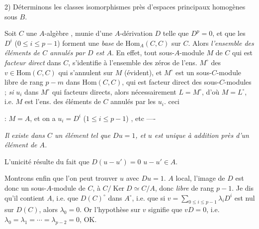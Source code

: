\documentclass[11pt,a4paper]{article}
\begin{document}

2) Déterminons les classes  isomorphismes près d'espaces
\struck{\ill{}} principaux homogènes sous $B$.

Soit $C$ une $A$-algèbre , munie d'une
$A$-dérivation $D$ telle que $D^p = 0$, et que les $D^i$
($0 \leq i \leq p-1$) forment une \emph{base} de
$\mathrm{Hom}_A(C, C)$ sur $C$. Alors \emph{l'ensemble des éléments de
$C$ annulés par $D$ est $A$}. En effet, tout sous-$A$-module $M$ de $C$
qui est  \emph{facteur direct} dans $C$,
s'identifie à l'ensemble des zéros de  l'ens.
$M^\circ$ des $v \in \mathrm{Hom}(C, C)$ qui s'annulent sur $M$
(évident), et $M^\circ$ est un sous-$C$-module libre de rang $p - m$ dans
$\mathrm{Hom}(C, C)$, \struck{\ill{}} qui est facteur direct \ill{} des
sous-$C$-modules ; \ill{} \ill{} \emph{si} \ill{} \ill{} $u_i$ dans
$M^\circ$   qui \ill{} facteurs
directs, alors nécessairement $L = M^\circ$, d'où $M = L^\circ$, i.e.
$M$ est l'ens. des éléments de $C$ annulés par les $u_i$. \ill{}
 ceci


: $M = A$, et on a $u_i = D^i$ ($1 \leq i \leq p-1$) \ill{}, etc ----

  \emph{Il existe dans $C$ un
élément}  \struck{\ill{}} \emph{tel que $Du = 1$, et $u$ est
unique à addition près d'un élément de $A$.}

L'unicité résulte du fait que \struck{\ill{} \ill{} \ill{}}
$D(u - u') = 0$ \struck{\ill{}}  $u - u' \in A$.

Montrons enfin que l'on peut trouver $u$ avec $Du = 1$.
 \ill{}
$A$ local, l'image de $D$ est donc un sous-$A$-module de $C$,
 à $C / \operatorname{Ker} D \simeq C/A$, donc
\emph{libre} de rang $p - 1$. Je dis qu'il contient $A$, i.e. que
$D(C)^\circ$  dans $A^\circ$, i.e. que si
$v = \sum_{0 \leq i \leq p-1} \lambda_i D^i$ est nul sur $D(C)$, alors
$\lambda_0 = 0$. Or l'hypothèse sur $v$ signifie que $vD = 0$, i.e.
$\lambda_0 = \lambda_1 = \cdots = \lambda_{p-2} = 0$, OK.
\end{document}
